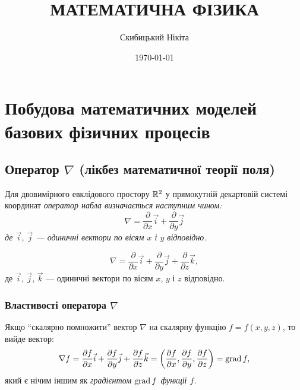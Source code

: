 

\title{{\Huge МАТЕМАТИЧНА ФІЗИКА}}
\author{Скибицький Нікіта}
\date{\today}




\tableofcontents

\setcounter{section}{2}

\section{Побудова математичних моделей базових фізичних процесів}

\setcounter{subsection}{-1}
\subsection{Оператор \texorpdfstring{$\nabla$}{nabla} (лікбез математичної теорії поля)}

\begin{definition}
    Для двовимірного евклідового простору $\mathbb{R}^2$ у прямокутній декартовій системі координат \it{оператор набла} визначається наступним чином:
    \begin{equation}
    	\nabla = \frac{\partial}{\partial x} \vec{i} + \frac{\partial}{\partial y} \vec{j}
    \end{equation}
    де $\vec{i}$, $\vec{j}$ --- одиничні вектори по вісям $x$ і $y$ відповідно.
\end{definition}

\begin{definition}
    \begin{equation}
    	\nabla = \frac{\partial}{\partial x} \vec{i} + \frac{\partial}{\partial y} \vec{j} + \frac{\partial}{\partial z} \vec{k},
    \end{equation}
    де $\vec{i}$, $\vec{j}$, $\vec{k}$ --- одиничні вектори по вісям $x$, $y$ і $z$ відповідно.
\end{definition}

\subsubsection{Властивості оператора \texorpdfstring{$\nabla$}{nabla}}

\begin{definition}
	Якщо ``скалярно помножити'' вектор $\nabla$ на скалярну функцію $f = f(x, y, z)$, то вийде вектор:
	\begin{equation}
    	\nabla f = \frac{\partial f}{\partial x} \vec{i} + \frac{\partial f}{\partial y} \vec{j} + \frac{\partial f}{\partial z} \vec{k} = \left( \frac{\partial f}{\partial x}, \frac{\partial f}{\partial y}, \frac{\partial f}{\partial z} \right) = \operatorname{grad} f,
    \end{equation}
    який є нічим іншим як \it{градієнтом} $\operatorname{grad} f$ функції $f$.
\end{definition}

